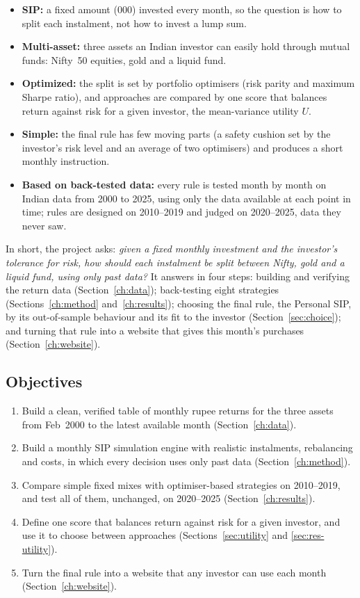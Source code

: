 \begin{itemize}
  \item \textbf{SIP:} a fixed amount (000) invested every month, so the question is how to
        split each instalment, not how to invest a lump sum.
  \item \textbf{Multi-asset:} three assets an Indian investor can easily hold through mutual funds:
        Nifty~50 equities, gold and a liquid fund.
  \item \textbf{Optimized:} the split is set by portfolio optimisers (risk parity and maximum
        Sharpe ratio), and approaches are compared by one score that balances return against risk
        for a given investor, the mean-variance utility $U$.
  \item \textbf{Simple:} the final rule has few moving parts (a safety cushion set by the investor's
        risk level and an average of two optimisers) and produces a short monthly instruction.
  \item \textbf{Based on back-tested data:} every rule is tested month by month on Indian data from
        2000 to 2025, using only the data available at each point in time; rules are designed on
        2010--2019 and judged on 2020--2025, data they never saw.
\end{itemize}

In short, the project asks: \emph{given a fixed monthly investment and the investor's tolerance for
risk, how should each instalment be split between Nifty, gold and a liquid fund, using only past
data?} It answers in four steps: building and verifying the return data (Section~\ref{ch:data});
back-testing eight strategies (Sections~\ref{ch:method} and~\ref{ch:results}); choosing the final
rule, the Personal SIP, by its out-of-sample behaviour and its fit to the investor
(Section~\ref{sec:choice}); and turning that rule into a website that gives this month's purchases
(Section~\ref{ch:website}).

\subsection{Objectives}

\begin{enumerate}
  \item Build a clean, verified table of monthly rupee returns for the three assets from
        Feb~2000 to the latest available month (Section~\ref{ch:data}).
  \item Build a monthly SIP simulation engine with realistic instalments, rebalancing and costs,
        in which every decision uses only past data (Section~\ref{ch:method}).
  \item Compare simple fixed mixes with optimiser-based strategies on 2010--2019, and test all of
        them, unchanged, on 2020--2025 (Section~\ref{ch:results}).
  \item Define one score that balances return against risk for a given investor, and use it to
        choose between approaches (Sections~\ref{sec:utility} and \ref{sec:res-utility}).
  \item Turn the final rule into a website that any investor can use each month
        (Section~\ref{ch:website}).
\end{enumerate}

